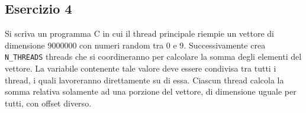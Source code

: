\documentclass{article}
\def\code#1{\texttt{#1}}
\begin{document}
\subsection*{Esercizio 4}
Si scriva un programma C in cui il thread principale riempie un vettore di dimensione 9000000 con numeri random tra 0 e 9. Successivamente crea \code{N\_THREADS} threads che si coordineranno per calcolare la somma degli elementi del vettore. La variabile contenente tale valore deve essere condivisa tra tutti i thread, i quali lavoreranno direttamente su di essa. Ciascun thread calcola la somma relativa solamente ad una porzione del vettore, di dimensione uguale per tutti, con offset diverso.
\end{document}
